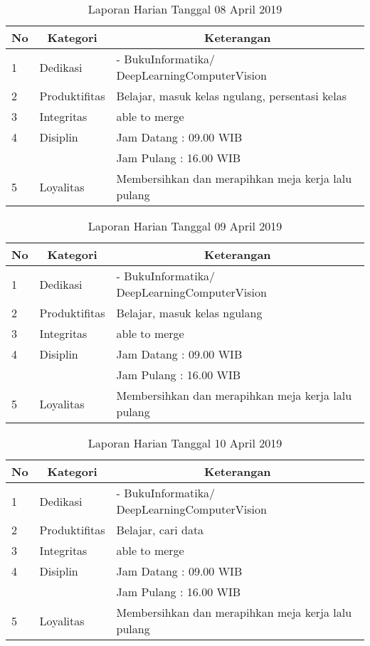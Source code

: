 \begin{table}[htp]
\caption{Laporan Harian Tanggal 08 April 2019}
\label{tab:lh080419}
\begin{tabular}{|l|l|l|}
\hline
\textbf{No} & \multicolumn{1}{c|}{\textbf{Kategori}} & \multicolumn{1}{c|}{\textbf{Keterangan}} \\ \hline
1 & Dedikasi & - BukuInformatika/ DeepLearningComputerVision \\ \hline
2 & Produktifitas & Belajar, masuk kelas ngulang, persentasi kelas  \\
3 & Integritas & able to merge \\ \hline
4 & Disiplin & Jam Datang : 09.00 WIB \\
 &  & Jam Pulang : 16.00 WIB \\ \hline
5 & Loyalitas & Membersihkan dan merapihkan meja kerja lalu pulang  \\ \hline
\end{tabular}
\end{table}

\begin{table}[htp]
\caption{Laporan Harian Tanggal 09 April 2019}
\label{tab:lh090419}
\begin{tabular}{|l|l|l|}
\hline
\textbf{No} & \multicolumn{1}{c|}{\textbf{Kategori}} & \multicolumn{1}{c|}{\textbf{Keterangan}} \\ \hline
1 & Dedikasi & - BukuInformatika/ DeepLearningComputerVision \\ \hline
2 & Produktifitas & Belajar, masuk kelas ngulang  \\
3 & Integritas & able to merge \\ \hline
4 & Disiplin & Jam Datang : 09.00 WIB \\
 &  & Jam Pulang : 16.00 WIB \\ \hline
5 & Loyalitas & Membersihkan dan merapihkan meja kerja lalu pulang  \\ \hline
\end{tabular}
\end{table}

\begin{table}[htp]
\caption{Laporan Harian Tanggal 10 April 2019}
\label{tab:lh100419}
\begin{tabular}{|l|l|l|}
\hline
\textbf{No} & \multicolumn{1}{c|}{\textbf{Kategori}} & \multicolumn{1}{c|}{\textbf{Keterangan}} \\ \hline
1 & Dedikasi & - BukuInformatika/ DeepLearningComputerVision \\ \hline
2 & Produktifitas & Belajar, cari data  \\
3 & Integritas & able to merge \\ \hline
4 & Disiplin & Jam Datang : 09.00 WIB \\
 &  & Jam Pulang : 16.00 WIB \\ \hline
5 & Loyalitas & Membersihkan dan merapihkan meja kerja lalu pulang  \\ \hline
\end{tabular}
\end{table}

